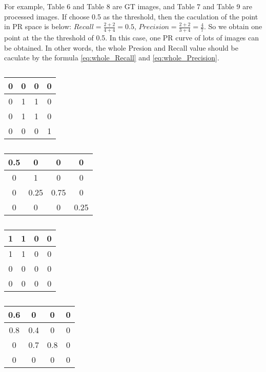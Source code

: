 \documentclass[a4paper,12pt]{article}
\begin{document}
For example, Table 6 and Table 8 are GT images, and Table 7 and Table 9 are processed images. If choose 0.5 as the threshold, then the caculation of the point in PR space is below:
$Recall=\frac{2+2}{4+4}=0.5$, $Precision =\frac{2+2}{3+4}=\frac{4}{7}$.
So we obtain one point at the the threshold of 0.5. In this case, one PR curve of lots of images can be obtained. In other words, the whole Presion and Recall value should be caculate by the formula \ref{eq:whole_Recall} and \ref{eq:whole_Precision}.
\begin{table}[!ht]
\begin{minipage}[t]{0.17\linewidth}
\begin{tabular}{|c|c|c|c|}
\hline
0&0&0&0\\
\hline
0&1&1&0\\
\hline
0&1&1&0\\
\hline
0&0&0&1\\
\hline
\end{tabular} 
\caption{}
\end{minipage}
\begin{minipage}[t]{0.33\linewidth}
\begin{tabular}{|c|c|c|c|}
\hline
0.5&0&0&0\\
\hline
0&1&0&0\\
\hline
0&0.25&0.75&0\\
\hline
0&0&0&0.25\\
\hline
\end{tabular} 
\caption{}
\end{minipage}
\begin{minipage}[t]{0.2\linewidth}
\begin{tabular}{|c|c|c|c|}
\hline
1&1&0&0\\
\hline
1&1&0&0\\
\hline
0&0&0&0\\
\hline
0&0&0&0\\
\hline
\end{tabular}
\caption{} 
\end{minipage}
\begin{minipage}[t]{0.01\linewidth}
\begin{tabular}{|c|c|c|c|}
\hline
0.6&0&0&0\\
\hline
0.8&0.4&0&0\\
\hline
0&0.7&0.8&0\\
\hline
0&0&0&0\\
\hline
\end{tabular} 
\caption{}
\end{minipage}
\end{table}
\end{document}
